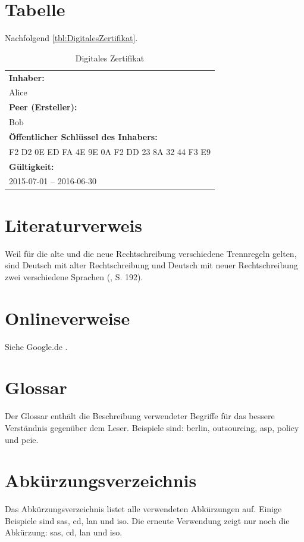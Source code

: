 \section{Tabelle}

Nachfolgend \autoref{tbl:DigitalesZertifikat}.

\begin{table}[H]
	\begin{center}
		\renewcommand{\arraystretch}{1.3}
		\begin{tabular}{|l|}
			\hline
			\textbf{Inhaber:}\\
			Alice \\ \hline
			\textbf{Peer (Ersteller):}\\
			Bob \\ \hline
			\textbf{Öffentlicher Schlüssel des Inhabers:}\\
			F2 D2 0E ED FA 4E 9E 0A F2 DD 23 8A 32 44 F3 E9 \\ \hline
			\textbf{Gültigkeit:}\\
			2015-07-01 – 2016-06-30 \\ \hline
		\end{tabular}
	\end{center}
	\caption{Digitales Zertifikat}
	\label{tbl:DigitalesZertifikat}
\end{table}

\section{Literaturverweis}

Weil für die alte und die neue Rechtschreibung verschiedene Trennregeln gelten, sind Deutsch mit alter Rechtschreibung und Deutsch mit neuer Rechtschreibung zwei verschiedene Sprachen (\cite{Knappen2009}, S. 192).

\section{Onlineverweise}

Siehe Google.de \cite{Google2015}.

\section{Glossar}
Der Glossar enthält die Beschreibung verwendeter Begriffe für das bessere Verständnis gegenüber dem Leser. Beispiele sind: \gls{berlin}, \gls{outsourcing}, \gls{asp}, \gls{policy} und \gls{pcie}.

\section{Abkürzungsverzeichnis}
Das Abkürzungsverzeichnis listet alle verwendeten Abkürzungen auf. Einige Beispiele sind \gls{sas}, \gls{cd}, \gls{lan} und \gls{iso}. Die erneute Verwendung zeigt nur noch die Abkürzung: \gls{sas}, \gls{cd}, \gls{lan} und \gls{iso}.